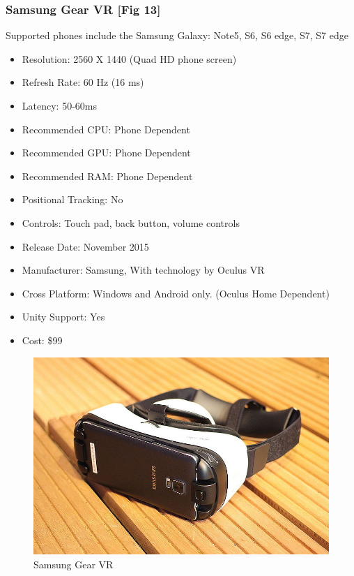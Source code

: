 \documentclass[a4paper,10pt]{article}
\begin{document}
\subsubsection{Samsung Gear VR [Fig 13]}
\label{section:gearVR}
	Supported phones include the Samsung Galaxy: Note5, S6, S6 edge, S7, S7 edge  
	\begin{itemize}
	  \item Resolution: 2560 X 1440 (Quad HD phone screen)
	  \item Refresh Rate: 60 Hz (16 ms)
	  \item Latency: 50-60ms
	  \item Recommended CPU: Phone Dependent
	  \item Recommended GPU: Phone Dependent
	  \item Recommended RAM: Phone Dependent
	  \item Positional Tracking: No
	  \item Controls: Touch pad, back button, volume controls
	  \item Release Date: November 2015
	  \item Manufacturer: Samsung, With technology by Oculus VR
	  \item Cross Platform: Windows and Android only. (Oculus Home Dependent)
	  \item Unity Support: Yes
	  \item Cost: \$99
	\end{itemize}
	\begin{figure}[H]
	\includegraphics[width=\linewidth,height=\paperheight,keepaspectratio]{gear.jpg}
	\caption{Samsung Gear VR}
	\label{fig:GearImg}
	\end{figure}
	\pagebreak
\end{document}
